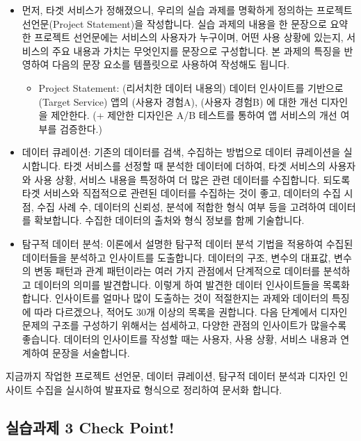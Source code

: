 \documentclass[
  letterpaper,
]{book}
\providecommand{\tightlist}{%
  \setlength{\itemsep}{0pt}\setlength{\parskip}{0pt}}\usepackage{longtable,booktabs,array}
\begin{document}
\begin{itemize}
\tightlist
\item
  먼저, 타겟 서비스가 정해졌으니, 우리의 실습 과제를 명확하게 정의하는
  프로젝트 선언문(Project Statement)을 작성합니다. 실습 과제의 내용을 한
  문장으로 요약한 프로젝트 선언문에는 서비스의 사용자가 누구이며, 어떤
  사용 상황에 있는지, 서비스의 주요 내용과 가치는 무엇인지를 문장으로
  구성합니다. 본 과제의 특징을 반영하여 다음의 문장 요소를 템플릿으로
  사용하여 작성해도 됩니다.

  \begin{itemize}
  \tightlist
  \item
    Project Statement: (리서치한 데이터 내용의) 데이터 인사이트를
    기반으로 (Target Service) 앱의 (사용자 경험A), (사용자 경험B) 에
    대한 개선 디자인을 제안한다. (+ 제안한 디자인은 A/B 테스트를 통하여
    앱 서비스의 개선 여부를 검증한다.)
  \end{itemize}
\item
  데이터 큐레이션: 기존의 데이터를 검색, 수집하는 방법으로 데이터
  큐레이션을 실시합니다. 타겟 서비스를 선정할 때 분석한 데이터에 더하여,
  타겟 서비스의 사용자와 사용 상황, 서비스 내용을 특정하여 더 많은 관련
  데이터를 수집합니다. 되도록 타겟 서비스와 직접적으로 관련된 데이터를
  수집하는 것이 좋고, 데이터의 수집 시점, 수집 사례 수, 데이터의 신뢰성,
  분석에 적합한 형식 여부 등을 고려하여 데이터를 확보합니다. 수집한
  데이터의 출처와 형식 정보를 함께 기술합니다.
\item
  탐구적 데이터 분석: 이론에서 설명한 탐구적 데이터 분석 기법을 적용하여
  수집된 데이터들을 분석하고 인사이트를 도출합니다. 데이터의 구조,
  변수의 대표값, 변수의 변동 패턴과 관계 패턴이라는 여러 가지 관점에서
  단계적으로 데이터를 분석하고 데이터의 의미를 발견합니다. 이렇게 하여
  발견한 데이터 인사이트들을 목록화 합니다. 인사이트를 얼마나 많이
  도출하는 것이 적절한지는 과제와 데이터의 특징에 따라 다르겠으나,
  적어도 30개 이상의 목록을 권합니다. 다음 단계에서 디자인 문제의 구조를
  구성하기 위해서는 섬세하고, 다양한 관점의 인사이트가 많을수록
  좋습니다. 데이터의 인사이트를 작성할 때는 사용자, 사용 상황, 서비스
  내용과 연계하여 문장을 서술합니다.
\end{itemize}

지금까지 작업한 프로젝트 선언문, 데이터 큐레이션, 탐구적 데이터 분석과
디자인 인사이트 수집을 실시하여 발표자료 형식으로 정리하여 문서화
합니다.

\subsection{실습과제 3 Check
Point!}\label{uxc2e4uxc2b5uxacfcuxc81c-3-check-point}
\end{document}
